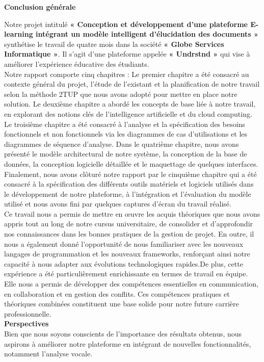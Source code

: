 \thispagestyle{empty}

\begin{center}
    \textbf{\Huge Conclusion générale}
\end{center}
  
Notre projet intitulé \textbf{« Conception et développement d’une plateforme E-learning intégrant un modèle intelligent d’élucidation des documents »} synthétise le travail de quatre mois dans la société \textbf{« Globe Services Informatique »}. Il s’agit d’une plateforme appelée \textbf{« Undrstnd »} qui vise à améliorer l’expérience éducative des étudiants.\\

Notre rapport comporte cinq chapitres : Le premier chapitre a été consacré au contexte général du projet, l’étude de l’existant et la planification de notre travail selon la méthode 2TUP que nous avons adopté pour mettre en place notre solution. Le deuxième chapitre a abordé les concepts de base liée à notre travail, en explorant des notions clés de l’intelligence artificielle et du cloud computing. Le troisième chapitre a été consacré à l’analyse et la spécification des besoins fonctionnels et non fonctionnels via les diagrammes de cas d’utilisations et les diagrammes de séquence d’analyse. Dans le quatrième chapitre, nous avons présenté le modèle architectural de notre système, la conception de la base de données, la conception logicielle détaillée et le maquettage de quelques interfaces. Finalement, nous avons clôturé notre rapport par le cinquième chapitre qui a été consacré à la spécification des différents outils matériels et logiciels utilisés dans le développement de notre plateforme, à l’intégration et l’évaluation du modèle utilisé et nous avons fini par quelques captures d’écran du travail réalisé.\\

Ce travail nous a permis de mettre en œuvre les acquis théoriques que nous avons appris tout au long de notre cursus universitaire, de consolider et d’approfondir nos connaissances dans les bonnes pratiques de la gestion de projet. En outre, il nous a également donné l'opportunité de nous familiariser avec les nouveaux langages de programmation et les nouveaux frameworks, renforçant ainsi notre capacité à nous adapter aux évolutions technologiques rapides.De plus, cette expérience a été particulièrement enrichissante en termes de travail en équipe. Elle nous a permis de développer des compétences essentielles en communication, en collaboration et en gestion des conflits. Ces compétences pratiques et théoriques combinées constituent une base solide pour notre future carrière professionnelle.\\

\noindent \textbf{Perspectives}\\
Bien que nous soyons conscients de l'importance des résultats obtenus, nous aspirons à améliorer notre plateforme en intégrant de nouvelles fonctionnalités, notamment l'analyse vocale. 
